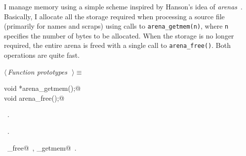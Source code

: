 \documentclass{report}
\begin{document}
I manage memory using a simple scheme inspired by Hanson's idea of
{\em arenas\/}~\cite{hanson:90}.
Basically, I allocate all the storage required when processing a
source file (primarily for names and scraps) using calls to 
\verb|arena_getmem(n)|, where \verb|n| specifies the number of bytes to
be allocated. When the storage is no longer required, the entire arena
is freed with a single call to  \verb|arena_free()|. Both operations
are quite fast.
\begin{flushleft} \small
\begin{minipage}{\linewidth} \label{scrap255}
$\langle\,${\it Function prototypes}\nobreak\ {\footnotesize {}}$\,\rangle\equiv$
\vspace{-1ex}
\begin{list}{}{} \item
\mbox{}\verb@extern void *arena_getmem();@\\
\mbox{}\verb@extern void arena_free();@\\
\mbox{}\verb@@{\NWsep}
\end{list}
\vspace{-1ex}
\footnotesize\addtolength{\baselineskip}{-1ex}
\begin{list}{}{\setlength{\itemsep}{-\parsep}\setlength{\itemindent}{-\leftmargin}}
\item \NWtxtMacroDefBy\ .
\item \NWtxtMacroRefIn\ .
\end{list}
\vspace{-2ex}
\footnotesize\addtolength{\baselineskip}{-1ex}
\begin{list}{}{\setlength{\itemsep}{-\parsep}\setlength{\itemindent}{-\leftmargin}}
\item \NWtxtIdentsUsed\nobreak\  \verb@arena_free@\nobreak\ , \verb@arena_getmem@\nobreak\ .\end{list}
\end{minipage}\\[4ex]
\end{flushleft}
\end{document}
